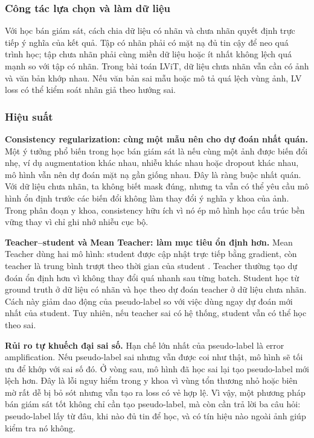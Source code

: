 \subsubsection{Công tác lựa chọn và làm dữ liệu}

Với học bán giám sát, cách chia dữ liệu có nhãn và chưa nhãn quyết định trực tiếp ý nghĩa của kết quả. Tập có nhãn phải có mặt nạ đủ tin cậy để neo quá trình học; tập chưa nhãn phải cùng miền dữ liệu hoặc ít nhất không lệch quá mạnh so với tập có nhãn. Trong bài toán LViT, dữ liệu chưa nhãn vẫn cần có ảnh và văn bản khớp nhau. Nếu văn bản sai mẫu hoặc mô tả quá lệch vùng ảnh, LV loss có thể kiểm soát nhãn giả theo hướng sai.

\subsubsection{Hiệu suất}

\textbf{Consistency regularization: cùng một mẫu nên cho dự đoán nhất quán.} Một ý tưởng phổ biến trong học bán giám sát là nếu cùng một ảnh được biến đổi nhẹ, ví dụ augmentation khác nhau, nhiễu khác nhau hoặc dropout khác nhau, mô hình vẫn nên dự đoán mặt nạ gần giống nhau. Đây là ràng buộc nhất quán. Với dữ liệu chưa nhãn, ta không biết mask đúng, nhưng ta vẫn có thể yêu cầu mô hình ổn định trước các biến đổi không làm thay đổi ý nghĩa y khoa của ảnh. Trong phân đoạn y khoa, consistency hữu ích vì nó ép mô hình học cấu trúc bền vững thay vì chỉ ghi nhớ nhiễu cục bộ.

\textbf{Teacher--student và Mean Teacher: làm mục tiêu ổn định hơn.} Mean Teacher dùng hai mô hình: student được cập nhật trực tiếp bằng gradient, còn teacher là trung bình trượt theo thời gian của student \cite{tarvainen2017meanteacher}. Teacher thường tạo dự đoán ổn định hơn vì không thay đổi quá nhanh sau từng batch. Student học từ ground truth ở dữ liệu có nhãn và học theo dự đoán teacher ở dữ liệu chưa nhãn. Cách này giảm dao động của pseudo-label so với việc dùng ngay dự đoán mới nhất của student. Tuy nhiên, nếu teacher sai có hệ thống, student vẫn có thể học theo sai.

\textbf{Rủi ro tự khuếch đại sai số.} Hạn chế lớn nhất của pseudo-label là error amplification. Nếu pseudo-label sai nhưng vẫn được coi như thật, mô hình sẽ tối ưu để khớp với sai số đó. Ở vòng sau, mô hình đã học sai lại tạo pseudo-label mới lệch hơn. Đây là lỗi nguy hiểm trong y khoa vì vùng tổn thương nhỏ hoặc biên mờ rất dễ bị bỏ sót nhưng vẫn tạo ra loss có vẻ hợp lệ. Vì vậy, một phương pháp bán giám sát tốt không chỉ cần tạo pseudo-label, mà còn cần trả lời ba câu hỏi: pseudo-label lấy từ đâu, khi nào đủ tin để học, và có tín hiệu nào ngoài ảnh giúp kiểm tra nó không.

